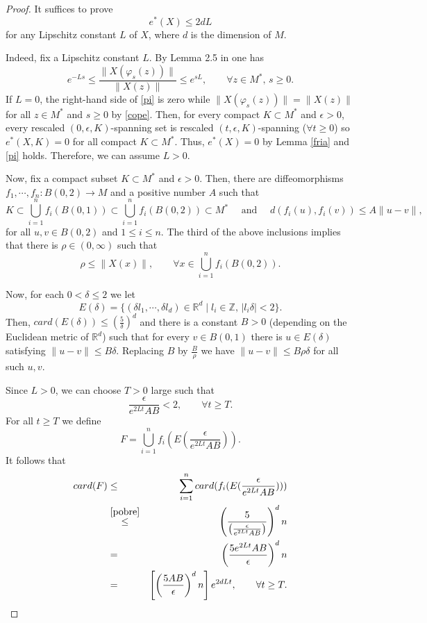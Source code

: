 \documentclass{amsart}
\numberwithin{equation}{section}
\begin{document}
\begin{proof}
It suffices to prove
\begin{equation}
\label{pi}
e^*(X)\leq 2d L
\end{equation}
for any Lipschitz constant $L$ of $X$, where $d$ is the dimension of $M$.

Indeed, fix a Lipschitz constant $L$.
By Lemma 2.5 in \cite{hw} one has
\begin{equation}
\label{cope}
e^{-Ls}\leq \frac{\|X(\varphi_s(z))\|}{\|X(z)\|}\leq e^{sL},\quad\quad\forall z\in M^*,\, s\geq0.
\end{equation}
If $L=0$, the right-hand side of \eqref{pi} is zero
while $\|X(\varphi_s(z))\|=\|X(z)\|$ for all $z\in M^*$ and $s\geq0$ by \eqref{cope}.
Then, for every compact $K\subset M^*$ and $\epsilon>0$, every rescaled $(0,\epsilon,K)$-spanning set is
rescaled $(t,\epsilon,K)$-spanning ($\forall t\geq0$) so $e^*(X,K)=0$
for all compact $K\subset M^*$. Thus, $e^*(X)=0$ by Lemma \ref{fria} and
\eqref{pi} holds.
Therefore, we can assume $L>0$.

Now, fix a compact subset $K\subset M^*$ and $\epsilon>0$.
Then, there are diffeomorphisms
$f_1,\cdots, f_n:B(0,2)\to M$ and a positive number $A$ such that
$$
K\subset \bigcup_{i=1}^nf_i(B(0,1))\subset \bigcup_{i=1}^nf_i(B(0,2))\subset M^*
\quad\mbox{ and }\quad
d(f_i(u),f_i(v))\leq A\|u-v\|,
$$
for all $u,v\in B(0,2)$ and $1\leq i\leq n$.
The third of the above inclusions implies that there is $\rho\in (0,\infty)$ such that
$$
\rho\leq \|X(x)\|,\quad\quad\forall x\in \bigcup_{i=1}^nf_i(B(0,2)).
$$

Now, for each $0<\delta\leq 2$ we let
$$
E(\delta)=\{(\delta l_1,\cdots,\delta l_d)\in \mathbb{R}^d\mid l_i\in \mathbb{Z},\, |l_i\delta|<2\}.
$$
Then, $card(E(\delta))\leq (\frac{5}\delta)^d$ and there is a constant $B>0$ (depending on the Euclidean metric of $\mathbb{R}^d$) such that for every $v\in B(0,1)$ there is $u\in E(\delta)$ satisfying $\|u-v\|\leq B\delta$. Replacing $B$ by $\frac{B}\rho$ we have
$\|u-v\|\leq B\rho\delta$ for all such $u,v$.

Since $L>0$, we can choose $T>0$ large such that
\begin{equation}
\label{pobre}
\frac{\epsilon}{e^{2Lt}AB}<2,\quad\quad\forall t\geq T.
\end{equation}
For all $t\geq T$ we define
$$
F=\bigcup_{i=1}^n f_i(E(\frac{\epsilon}{e^{2Lt}AB})).
$$
It follows that
\begin{eqnarray*}
card(F)&\leq & \sum_{i=1}^n card(f_i(E(\frac{\epsilon}{e^{2Lt}AB})))\\
&\overset{\eqref{pobre}}{\leq}& \left(\frac{5}{\left(\frac{\epsilon}{e^{2Lt}AB}\right)}\right)^dn\\
&=&
\left(\frac{5e^{2Lt}AB}{\epsilon}\right)^dn\\
&=& \left[\left(\frac{5AB}{\epsilon}\right)^dn\right]e^{2dLt},\quad\quad\forall t\geq T.
\end{eqnarray*}


\end{proof}
\end{document}
